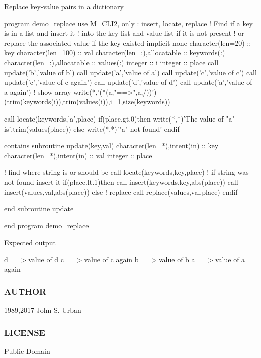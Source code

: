 Replace key-\/value pairs in a dictionary \begin{DoxyVerb}program demo_replace
use M_CLI2, only  : insert, locate, replace
! Find if a key is in a list and insert it
! into the key list and value list if it is not present
! or replace the associated value if the key existed
implicit none
character(len=20)            :: key
character(len=100)           :: val
character(len=:),allocatable :: keywords(:)
character(len=:),allocatable :: values(:)
integer                      :: i
integer                      :: place
call update('b','value of b')
call update('a','value of a')
call update('c','value of c')
call update('c','value of c again')
call update('d','value of d')
call update('a','value of a again')
! show array
write(*,'(*(a,"==>",a,/))')(trim(keywords(i)),trim(values(i)),i=1,size(keywords))

call locate(keywords,'a',place)
if(place.gt.0)then
   write(*,*)'The value of "a" is',trim(values(place))
else
   write(*,*)'"a" not found'
endif

contains
subroutine update(key,val)
character(len=*),intent(in)  :: key
character(len=*),intent(in)  :: val
integer                      :: place

! find where string is or should be
call locate(keywords,key,place)
! if string was not found insert it
if(place.lt.1)then
   call insert(keywords,key,abs(place))
   call insert(values,val,abs(place))
else ! replace
   call replace(values,val,place)
endif

end subroutine update
\end{DoxyVerb}
 end program demo\+\_\+replace

Expected output

d==$>$value of d c==$>$value of c again b==$>$value of b a==$>$value of a again

\subsubsection*{A\+U\+T\+H\+OR}

1989,2017 John S. Urban \subsubsection*{L\+I\+C\+E\+N\+SE}

Public Domain \mbox{\label{namespacem__cli2_ac327823dd714cd4c1667666158f0c135}} 
